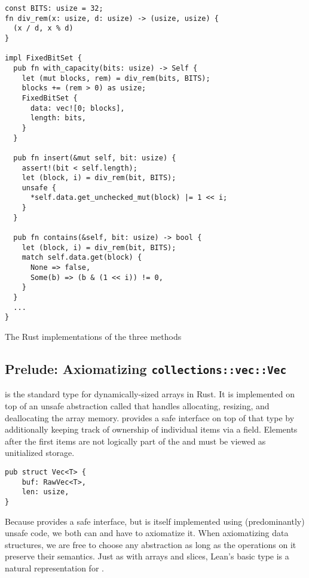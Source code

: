 \begin{listing}[bt!]
\begin{verbatim}
const BITS: usize = 32;
fn div_rem(x: usize, d: usize) -> (usize, usize) {
  (x / d, x % d)
}

impl FixedBitSet {
  pub fn with_capacity(bits: usize) -> Self {
    let (mut blocks, rem) = div_rem(bits, BITS);
    blocks += (rem > 0) as usize;
    FixedBitSet {
      data: vec![0; blocks],
      length: bits,
    }
  }

  pub fn insert(&mut self, bit: usize) {
    assert!(bit < self.length);
    let (block, i) = div_rem(bit, BITS);
    unsafe {
      *self.data.get_unchecked_mut(block) |= 1 << i;
    }
  }

  pub fn contains(&self, bit: usize) -> bool {
    let (block, i) = div_rem(bit, BITS);
    match self.data.get(block) {
      None => false,
      Some(b) => (b & (1 << i)) != 0,
    }
  }
  ...
}
\end{verbatim}

  \caption{The Rust implementations of the three methods}
  \label{lst:fixedbitset}
\end{listing}

\subsection{Prelude: Axiomatizing \texttt{collections::vec::Vec}}

 is the standard type for dynamically-sized arrays in Rust. It is
implemented on top of an unsafe abstraction called  that handles
allocating, resizing, and deallocating the array memory.  provides a
safe interface on top of that type by additionally keeping track of ownership of individual items
via a  field. Elements after the first  items are not
logically part of the  and must be viewed as unitialized storage.

\begin{verbatim}
pub struct Vec<T> {
    buf: RawVec<T>,
    len: usize,
}
\end{verbatim}

Because  provides a safe interface, but is itself implemented using
(predominantly) unsafe code, we both can and have to axiomatize it. When axiomatizing data structures, we are free to choose any abstraction as long
as the operations on it preserve their semantics. Just as with arrays and
slices, Lean's basic  type is a natural representation for
.

